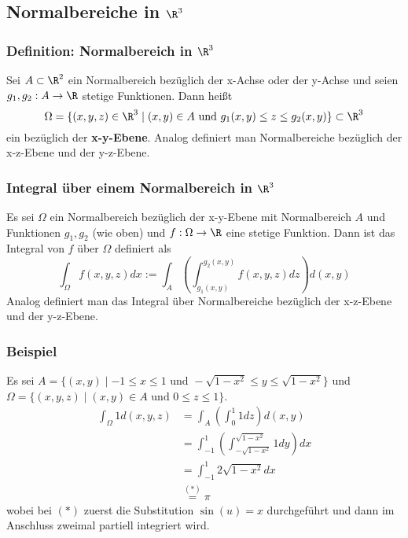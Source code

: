 \subsection{Normalbereiche in $\R^3$}
%
\begin{frame}\frametitle{Definition: Normalbereich in $\R^3$}
Sei $A \subset \R^2$ ein Normalbereich bezüglich der x-Achse oder der y-Achse und seien $g_1,g_2:A \to \R$ stetige Funktionen. Dann heißt
$$
\Omega=\{(x,y,z) \in \R^3 \mid (x,y) \in A \text{ und } g_1(x,y) \le z \le g_2(x,y)\} \subset \R^3
$$
ein  bezüglich der \textbf{x-y-Ebene}.
\pause\vfill
Analog definiert man Normalbereiche bezüglich der x-z-Ebene und der y-z-Ebene.
\end{frame}
%
%
\begin{frame}\frametitle{Integral über einem Normalbereich in $\R^3$}
Es sei $\Omega$ ein Normalbereich bezüglich der x-y-Ebene mit Normalbereich $A$ und Funktionen $g_1,g_2$ (wie oben) und $f:\Omega \to \R$ eine stetige Funktion. Dann ist das Integral von $f$ über $\Omega$ definiert als
$$
\int_\Omega f(x,y,z)dx:= \int_A \left(\int_{g_1(x,y)}^{g_2(x,y)} f(x,y,z) dz \right)d(x,y)
$$
\pause \vfill
Analog definiert man das Integral über Normalbereiche bezüglich der x-z-Ebene und der y-z-Ebene.
	
	
\end{frame}
%
\begin{frame}\frametitle{Beispiel}
Es sei $A=\{(x,y) \mid -1 \le x \le 1 \text{ und } -\sqrt{1-x^2} \le y \le \sqrt{1-x^2}\}$ und $\Omega=\{(x,y,z)\mid (x,y) \in A \text{ und } 0 \le z \le 1\}$. 
\begin{align*}
\int_\Omega 1 d(x,y,z) &= \int_A \left( \int_{0}^{1} 1 dz \right) d(x,y)\\
&=\int_{-1}^1 \left( \int_{-\sqrt{1-x^2}}^{\sqrt{1-x^2}} 1 dy\right)dx\\
&=\int_{-1}^1 2 \sqrt{1-x^2} dx\\
&\stackrel{(*)}{=}\pi 
\end{align*}
wobei bei $(*)$ zuerst die Substitution $\sin(u)=x$ durchgeführt und dann im Anschluss zweimal partiell integriert wird.
	
\end{frame}
%



